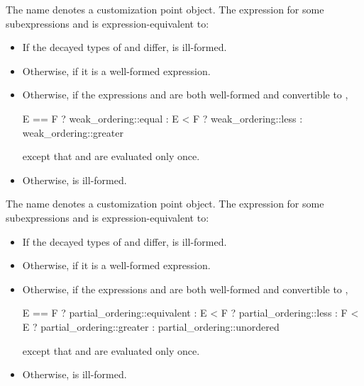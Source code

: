 %
\pnum
The name  denotes
a customization point object.
The expression 
for some subexpressions  and 
is expression-equivalent to:
\begin{itemize}
\item
  If the decayed types of  and  differ,
   is ill-formed.
\item
  Otherwise,  if it is a well-formed expression.
\item
  Otherwise, if the expressions  and 
  are both well-formed and convertible to ,
\begin{codeblock}
E == F ? weak_ordering::equal :
E < F  ? weak_ordering::less :
         weak_ordering::greater
\end{codeblock}
except that  and  are evaluated only once.
\item
  Otherwise,  is ill-formed.
\end{itemize}

%
\pnum
The name  denotes
a customization point object.
The expression 
for some subexpressions  and 
is expression-equivalent to:
\begin{itemize}
\item
  If the decayed types of  and  differ,
   is ill-formed.
\item
  Otherwise,  if it is a well-formed expression.
\item
  Otherwise, if the expressions  and 
  are both well-formed and convertible to ,
\begin{codeblock}
E == F ? partial_ordering::equivalent :
E < F  ? partial_ordering::less :
F < E  ? partial_ordering::greater :
         partial_ordering::unordered
\end{codeblock}
except that  and  are evaluated only once.
\item
  Otherwise,  is ill-formed.
\end{itemize}

